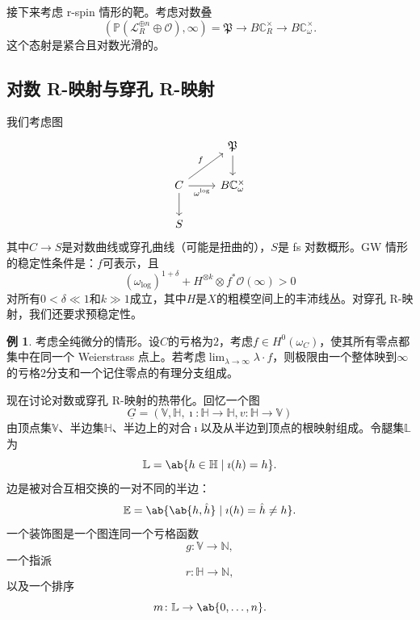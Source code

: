 \documentclass{amsart}
\theoremstyle{definition}
\newtheorem{exm}[thm]{例}
\theoremstyle{remark}
\theoremstyle{plain}
\theoremstyle{definition}
\theoremstyle{remark}
\newcommand{\N}{\mathbb{N}}
\newcommand{\C}{\mathbb{C}}
\newcommand{\E}{\mathbb{E}}
\newcommand{\V}{\mathbb{V}}
\renewcommand{\H}{\mathbb{H}}
\renewcommand{\L}{\mathbb{L}}
\renewcommand{\P}{\mathbb{P}}
\newcommand{\mc}[1]{\mathcal{#1}}
\newcommand{\mf}[1]{\mathfrak{#1}}
\newcommand{\ul}[1]{\underline{#1}}
\newcommand{\1}{\mathbf{1}}
\newcommand{\2}{\mathbf{2}}
\newcommand{\3}{\mathbf{3}}
\begin{document}
接下来考虑 r-spin 情形的靶。考虑对数叠
\[ (\P(\mc{L}_R^{\oplus n} \oplus \mc{O}), \infty) = \mf{P} \to B \C_R^{\times} \to B \C_{\omega}^{\times}. \]
这个态射是紧合且对数光滑的。

\subsection{对数 R-映射与穿孔 R-映射}%
\label{sub:Log and punctured R-maps}

我们考虑图
\begin{equation*}
\begin{tikzcd}
    & \mf{P} \ar{d} \\
    C \ar{ur}{f} \ar{r}[swap]{\omega^{\log}} \ar{d} & B \C_{\omega}^{\times} \\
    S
\end{tikzcd}
\end{equation*}
其中\(C \to S\)是对数曲线或穿孔曲线（可能是扭曲的），\(S\)是 fs 对数概形。GW 情形的稳定性条件是：\(f\)可表示，且
\[ (\omega_{\log})^{1+\delta} + H^{\otimes k} \otimes f^* \mc{O}(\infty) > 0 \]
对所有\(0 < \delta \ll 1\)和\(k \gg 1\)成立，其中\(H\)是\(X\)的粗模空间上的丰沛线丛。对穿孔 R-映射，我们还要求预稳定性。

\begin{exm}
    考虑全纯微分的情形。设\(C\)的亏格为\(2\)，考虑\(f \in H^0(\omega_C)\)，使其所有零点都集中在同一个 Weierstrass 点上。若考虑\(\lim_{\lambda \to \infty} \lambda \cdot f\)，则极限由一个整体映到\(\infty\)的亏格\(2\)分支和一个记住零点的有理分支组成。
\end{exm}

现在讨论对数或穿孔 R-映射的热带化。回忆一个图
\[ \ul{G} = (\V, \H, \imath \colon \H \to \H, v \colon \H \to \V) \]
由顶点集\(\V\)、半边集\(\H\)、半边上的对合\(\imath\)以及从半边到顶点的根映射组成。令腿集\(\L\)为
\[ \L = \ab\{ h \in \H \mid \imath(h) = h\}. \]
边是被对合互相交换的一对不同的半边：
\[ \E = \ab\{ \ab\{h, \hat{h}\} \mid \imath(h) = \hat{h} \neq h \}. \]
一个装饰图是一个图连同一个亏格函数
\[ g \colon \V \to \N, \]
一个指派
\[ r \colon \H \to \N, \]
以及一个排序
\[ m \colon \L \to \ab\{0, \ldots, n\}. \]
\end{document}
